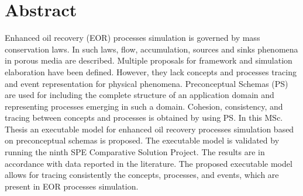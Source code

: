 







\chapter*{Abstract}
Enhanced oil recovery (EOR) processes simulation is governed by mass conservation laws. In such laws, flow, accumulation, sources and sinks phenomena in porous media are described. Multiple proposals for framework and simulation elaboration have been defined. However, they lack concepts and processes tracing and event representation for physical phenomena. Preconceptual Schemas (PS) are used for including the complete structure of an application domain and representing processes emerging in such a domain. Cohesion, consistency, and tracing between concepts and processes is obtained by using PS. In this MSc. Thesis an executable model for enhanced oil recovery processes simulation based on preconceptual schemas is proposed. The executable model is validated by running the ninth SPE Comparative Solution Project. The results are in accordance with data reported in the literature. The proposed executable model allows for tracing consistently the concepts, processes, and events, which are present in EOR processes simulation. \\

